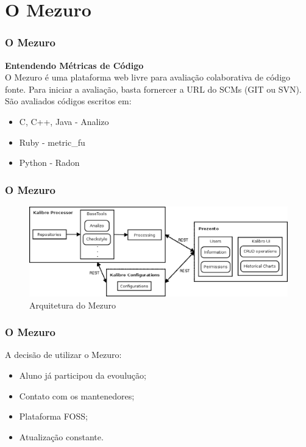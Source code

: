 \documentclass{beamer}
\begin{document}
\section{O Mezuro} %

\begin{frame}
\frametitle{O Mezuro}

\center
\textbf{Entendendo Métricas de Código} \\
O Mezuro é uma plataforma web livre para avaliação colaborativa de código fonte. Para iniciar a avaliação, basta fornercer a URL do SCMs (GIT ou SVN). São avaliados códigos escritos em:
\begin{itemize}
\item C, C++, Java - Analizo
\item Ruby - metric\_fu
\item Python - Radon
\end{itemize} 

\end{frame}


\begin{frame}
\frametitle{O Mezuro}

\begin{figure}[!htb]
  \centering
    \includegraphics[keepaspectratio=true,scale=0.4]
    {../figuras/mezuroCloudArch.eps}
  \caption{Arquitetura do Mezuro \cite{camarinhaOSS2015}}
  \label{fig:parallel}
\end{figure}

\end{frame}


\begin{frame}
\frametitle{O Mezuro}

A decisão de utilizar o Mezuro:
\begin{itemize}
\item Aluno já participou da evoulução;
\item Contato com os mantenedores;
\item Plataforma FOSS;
\item Atualização constante.
\end{itemize} 

\end{frame}
\end{document}
